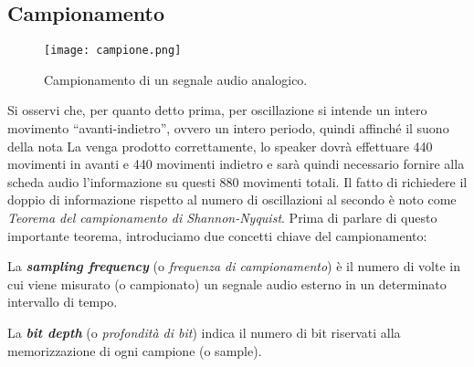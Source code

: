 		\subsection{Campionamento} \label{subsec:campionamento}
		
		\begin{figure}[h!]
			\centering
				\texttt{[image: campione.png]}
			\caption{Campionamento di un segnale audio analogico.}
			\label{fig:campione}
		\end{figure}
		
		Si osservi che, per quanto detto prima, per oscillazione si intende un intero movimento ``avanti-indietro'', ovvero un intero periodo, quindi affinché il suono della nota La venga prodotto correttamente, lo speaker dovrà effettuare 440 movimenti in avanti e 440 movimenti indietro e sarà quindi necessario fornire alla scheda audio l'informazione su questi 880 movimenti totali. Il fatto di richiedere il doppio di informazione rispetto al numero di oscillazioni al secondo è noto come \textit{Teorema del campionamento di Shannon-Nyquist}. Prima di parlare di questo importante teorema, introduciamo due concetti chiave del campionamento:
		
		\begin{defi} \label{defi:sampling_frequency}
			La \emph{\textbf{sampling frequency}} (o \emph{frequenza di campionamento}) è il numero di volte in cui viene misurato (o campionato) un segnale audio esterno in un determinato intervallo di tempo.
		\end{defi}
		
		\begin{defi} \label{defi:bit_depth}
			La \emph{\textbf{bit depth}} (o \emph{profondità di bit}) indica il numero di bit riservati alla memorizzazione di ogni campione (o sample).
		\end{defi}
		
